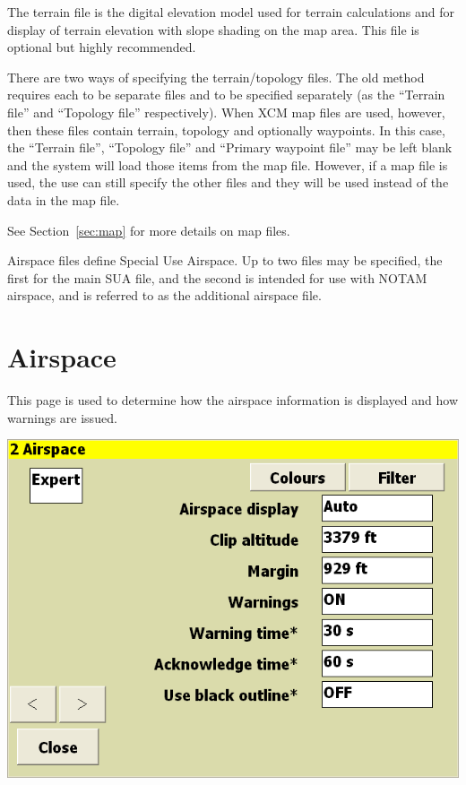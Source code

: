 \documentclass[a4paper,12pt]{refrep}
\begin{document}
The terrain file is the digital elevation model used for terrain
calculations and for display of terrain elevation with slope shading
on the map area.  This file is optional but highly recommended.

There are two ways of specifying the terrain/topology files.  The old
method requires each to be separate files and to be specified
separately (as the ``Terrain file'' and ``Topology file''
respectively).  When XCM map files are used, however, then these files
contain terrain, topology and optionally waypoints.  In this case, the
``Terrain file'', ``Topology file'' and ``Primary waypoint file'' may
be left blank and the system will load those items from the map file.
However, if a map file is used, the use can still specify the other
files and they will be used instead of the data in the map file.

See Section~\ref{sec:map} for more details on map files.

Airspace files define Special Use Airspace.  Up to two files may be
specified, the first for the main SUA file, and the second is intended
for use with NOTAM airspace, and is referred to as the additional
airspace file.

\clearpage
\section{Airspace}

This page is used to determine how the airspace information is
displayed and how warnings are issued.

\begin{center}
\includegraphics[angle=0,width=\linewidth,keepaspectratio='true']{figures/config-1.png}
\end{center}
\end{document}
